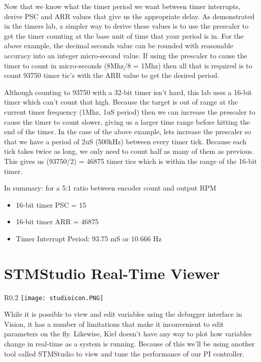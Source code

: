 \documentclass[openany,11pt,fleqn]{book} %
\begin{document}
Now that we know what the timer period we want between timer interrupts, derive PSC and ARR values that give us the appropriate delay. As demonstrated in the timers lab, a simpler way to derive these values is to use the prescaler to get the timer counting at the base unit of time that your period is in. For the above example, the decimal seconds value can be rounded with reasonable accuracy into an integer micro-second value. If using the prescaler to cause the timer to count in micro-seconds (8Mhz/8 = 1Mhz) then all that is required is to count 93750 timer tic's with the ARR value to get the desired period. 

Although counting to 93750 with a 32-bit timer isn't hard, this lab uses a 16-bit timer which can't count that high. Because the target is out of range at the current timer frequency (1Mhz, 1uS period) then we can increase the prescaler to cause the timer to count slower, giving us a larger time range before hitting the end of the timer. In the case of the above example, lets increase the prescaler so that we have a period of 2uS (500kHz) between every timer tick. Because each tick takes twice as long, we only need to count half as many of them as previous. This gives us (93750/2) = 46875 timer tics which is within the range of the 16-bit timer.

In summary: for a 5:1 ratio between encoder count and output RPM
\begin{itemize}
    \item 16-bit timer PSC = 15 
    \item 16-bit timer ARR = 46875
    \item Timer Interrupt Period: 93.75 mS or 10.666 Hz
\end{itemize}


\section{STMStudio Real-Time Viewer}

\begin{wrapfigure}{R}{0.2\textwidth}
    \centering\texttt{[image: studioicon.PNG]}
\end{wrapfigure}

While it is possible to view and edit variables using the debugger interface in {\textmu}Vision, it has a number of limitations that make it inconvenient to edit parameters on the fly. Likewise, Kiel doesn't have any way to plot how variables change in real-time as a system is running. Because of this we'll be using another tool called STMStudio to view and tune the performance of our PI controller. 
\end{document}
